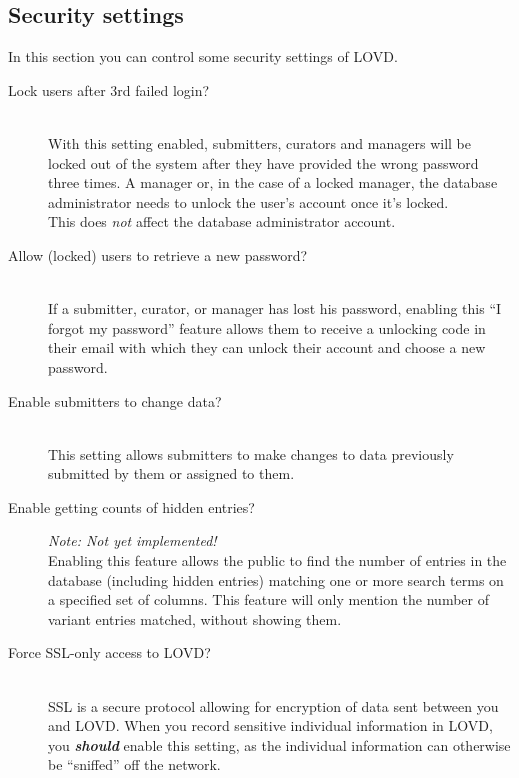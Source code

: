 \documentclass[a4paper,oneside,openany,12pt]{memoir}
\begin{document}
\hypertarget{ss_security_settings}{}
\subsection{Security settings}
In this section you can control some security settings of LOVD.
\begin{description}
  \item[Lock users after 3rd failed login?] \hfill \\
  With this setting enabled, submitters, curators and managers will be locked out of the system after they have provided the wrong password three times.
  A manager or, in the case of a locked manager, the database administrator needs to unlock the user's account once it's locked.
  \\
  This does \emph{not} affect the database administrator account.
  \item[Allow (locked) users to retrieve a new password?] \hfill \\
  If a submitter, curator, or manager has lost his password, enabling this ``I forgot my password'' feature allows them to receive a unlocking code in their email with which they can unlock their account and choose a new password.
  \item[Enable submitters to change data?] \hfill \\
  This setting allows submitters to make changes to data previously submitted by them or assigned to them.
  \item[Enable getting counts of hidden entries?] \hfill \par
  \emph{Note: Not yet implemented!}
  \\
  Enabling this feature allows the public to find the number of entries in the database (including hidden entries) matching one or more search terms on a specified set of columns.
  This feature will only mention the number of variant entries matched, without showing them.
  \item[Force SSL-only access to LOVD?] \hfill \\
  \nopagebreak
  SSL is a secure protocol allowing for encryption of data sent between you and LOVD.
  \nopagebreak
  When you record sensitive individual information in LOVD, you \emph{\textbf{should}} enable this setting, as the individual information can otherwise be ``sniffed'' off the network.

\end{description}
\end{document}

